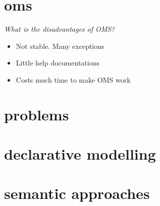 \section{oms}
\emph{What is the disadvantages of OMS?}\\
\begin{itemize}
	\item Not stable. Many exceptions
	\item Little help documentations
	\item Costs much time to make OMS work
\end{itemize}

\section{problems}
\section{declarative modelling}
\section{semantic approaches}